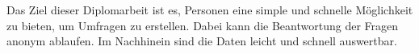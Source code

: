 \author{Weissengruber Nina}
Das Ziel dieser Diplomarbeit ist es, Personen eine simple und schnelle Möglichkeit zu bieten, um Umfragen zu erstellen. 
Dabei kann die Beantwortung der Fragen anonym ablaufen. Im Nachhinein sind die Daten leicht und 
schnell auswertbar.
